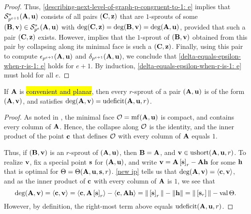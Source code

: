 \documentclass{amsart}
\begin{document}
\begin{proof}
Thus, \eqref{describing-next-level-of-graph-p-congruent-to-1: e} implies that $\mathcal{S}_{p^{e+1}}^{\ast}(\mathbf{A}, \mathbf{u})$ consists of all pairs $(\mathbf{C}, \mathbf{z})$ that are $1$-sprouts of some $(\mathbf{B}, \mathbf{v}) \in \mathcal{S}_{p^{e}}^{\ast}(\mathbf{A}, \mathbf{u})$ with $\deg(\mathbf{C}, \mathbf{z}) = \deg(\mathbf{B}, \mathbf{v}) = \deg(\mathbf{A}, \mathbf{u})$, provided that such a pair $(\mathbf{C}, \mathbf{z})$ exists.  However,   implies that the $1$-sprout of $(\mathbf{B}, \mathbf{v})$ obtained from this pair by collapsing along its minimal face is such a $(\mathbf{C}, \mathbf{z})$.  Finally, using this pair to compute $\epsilon_{p^{e+1}}(\mathbf{A}, \mathbf{u})$ and $\delta_{p^{e+1}}(\mathbf{A}, \mathbf{u})$, we conclude that \eqref{delta-equals-epsilon-when-r-is-1: e} holds for $e+1$.  By induction, \eqref{delta-equals-epsilon-when-r-is-1: e} must hold for all $e$.
\end{proof}

\begin{lemma}
\label{sprouts-in-convenient-planar-case: L}
If $\mathbf{A}$ is \hl{convenient and planar}, then every $r$-sprout of a pair $(\mathbf{A}, \mathbf{u})$ is of the form $(\mathbf{A}, \mathbf{v})$, and satisfies  $\operatorname{deg}(\mathbf{A},\mathbf{v}) = \operatorname{udeficit}(\mathbf{A}, \mathbf{u}, {r})$. 
\end{lemma}

\begin{proof}  As noted in ,  the minimal face $\mathcal{O} = \operatorname{mf}(\mathbf{A}, \mathbf{u})$ is compact, and contains every column of $\mathbf{A}$.  Hence, the collapse along $\mathcal{O}$ is the identity, and the inner product of the point $\mathbf{c}$ that defines $\mathcal{O}$ with every column of $\mathbf{A}$ equals $1$.

Thus, if $(\mathbf{B}, \mathbf{v})$ is an $r$-sprout of $(\mathbf{A}, \mathbf{u})$, then $\mathbf{B} = \mathbf{A}$, and $\mathbf{v} \in \operatorname{ushort}(\mathbf{A}, \mathbf{u}, {r})$.  To realize $\mathbf{v}$,  fix a special point $\mathbf{s}$ for $(\mathbf{A}, \mathbf{u})$, and write $\mathbf{v} = \mathbf{A} \left[ \mathbf{s} \right]_{{r}} - \mathbf{A} \mathbf{h}$ for some $\mathbf{h}$ that is optimal for $\Theta = \Theta(\mathbf{A}, \mathbf{u}, \mathbf{s}, {r})$.  \ref{new ip} tells us that $\deg(\mathbf{A}, \mathbf{v}) = \langle \mathbf{c}, \mathbf{v} \rangle$, and as the inner product of $\mathbf{c}$ with every column of $\mathbf{A}$ is $1$, we see that
\[ \deg(\mathbf{A}, \mathbf{v}) = \langle \mathbf{c}, \mathbf{v} \rangle = \langle \mathbf{c}, \mathbf{A} \left[ \mathbf{s} \right]_{{r}} \rangle - \langle \mathbf{c}, \mathbf{A} \mathbf{h} \rangle = \| \left[ \mathbf{s} \right]_{{r}} \| - \| \mathbf{h} \| = \| \left[ \mathbf{s}_{{r}} \right] \| - \operatorname{val} \Theta.\]
However, by definition, the right-most term above equals $\operatorname{udeficit}(\mathbf{A}, \mathbf{u}, {r})$. 
\end{proof}
\end{document}
